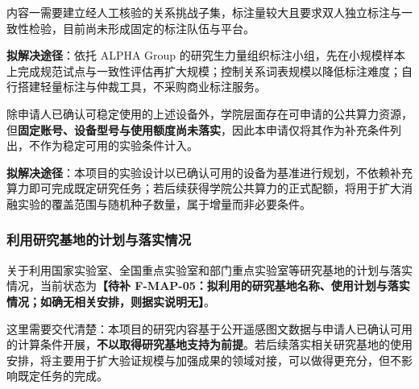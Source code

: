 
内容一需要建立经人工核验的关系挑战子集，标注量较大且要求双人独立标注与一致性检验，目前尚未形成固定的标注队伍与平台。

\textbf{拟解决途径}：依托 ALPHA Group 的研究生力量组织标注小组，先在小规模样本上完成规范试点与一致性评估再扩大规模；控制关系词表规模以降低标注难度；自行搭建轻量标注与仲裁工具，不采购商业标注服务。


除申请人已确认可稳定使用的上述设备外，学院层面存在可申请的公共算力资源，但\textbf{固定账号、设备型号与使用额度尚未落实}，因此本申请仅将其作为补充条件列出，不作为稳定可用的实验条件计入。

\textbf{拟解决途径}：本项目的实验设计以已确认可用的设备为基准进行规划，不依赖补充算力即可完成既定研究任务；若后续获得学院公共算力的正式配额，将用于扩大消融实验的覆盖范围与随机种子数量，属于增量而非必要条件。

\subsubsection{利用研究基地的计划与落实情况}

关于利用国家实验室、全国重点实验室和部门重点实验室等研究基地的计划与落实情况，当前状态为\textbf{【待补 F-MAP-05：拟利用的研究基地名称、使用计划与落实情况；如确无相关安排，则据实说明无】}。

这里需要交代清楚：本项目的研究内容基于公开遥感图文数据与申请人已确认可用的计算条件开展，\textbf{不以取得研究基地支持为前提}。若后续落实相关研究基地的使用安排，将主要用于扩大验证规模与加强成果的领域对接，可以做得更充分，但不影响既定任务的完成。
